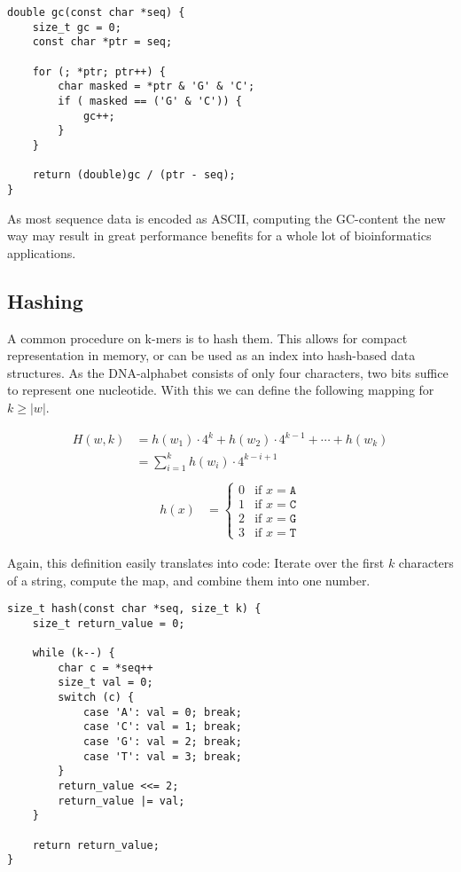 \documentclass[10pt,letterpaper]{article}
\begin{document}
\begin{lstlisting}
double gc(const char *seq) {  
    size_t gc = 0;
    const char *ptr = seq;

    for (; *ptr; ptr++) {
    	char masked = *ptr & 'G' & 'C';
        if ( masked == ('G' & 'C')) {
            gc++;
        }
    }

    return (double)gc / (ptr - seq);
}
\end{lstlisting}

As most sequence data is encoded as ASCII, computing the GC-content the new way may result in great performance benefits for a whole lot of bioinformatics applications.


\subsection{Hashing}
\label{sec:hash}

A common procedure on k-mers is to hash them. This allows for compact representation in memory, or can be used as an index into hash-based data structures. As the DNA-alphabet consists of only four characters, two bits suffice to represent one nucleotide. With this we can define the following mapping for $k \ge |w|$.

\begin{align*}
	H(w, k) &= h(w_1) \cdot 4^{k} + h(w_2) \cdot 4^{k-1} + \cdots + h(w_k) \\
	&= \sum_{i=1}^k h(w_i)\cdot 4^{k-i+1} \\
\end{align*}
\begin{align*}
	h(x) &=
		\begin{cases}
			0 & \text{if } x = \texttt{A} \\
			1 & \text{if } x = \texttt{C} \\
			2 & \text{if } x = \texttt{G} \\
			3 & \text{if } x = \texttt{T}
		\end{cases}
\end{align*}

Again, this definition easily translates into code: Iterate over the first $k$ characters of a string, compute the map, and combine them into one number.

\begin{lstlisting}
size_t hash(const char *seq, size_t k) {  
    size_t return_value = 0;

    while (k--) {
    	char c = *seq++
    	size_t val = 0;
    	switch (c) {
    		case 'A': val = 0; break;
    		case 'C': val = 1; break;
    		case 'G': val = 2; break;
    		case 'T': val = 3; break;
    	}
    	return_value <<= 2;
    	return_value |= val;
    }

    return return_value;
}
\end{lstlisting}
\end{document}
